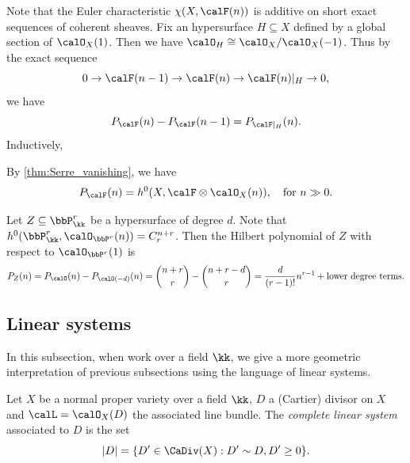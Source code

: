     Note that the Euler characteristic \(\chi(X, \calF(n))\) is additive on short exact sequences of coherent sheaves.
    Fix an hypersurface \(H \subseteq X\) defined by a global section of \(\calO_X(1)\).
    Then we have \(\calO_H \cong \calO_X / \calO_X(-1)\).
    Thus by the exact sequence
    \[ 0 \to \calF(n-1) \to \calF(n) \to \calF(n)|_H \to 0, \]
    we have
    \[ P_{\calF}(n) - P_{\calF}(n-1) = P_{\calF|_H}(n). \]
    Inductively, 

    By \cref{thm:Serre_vanishing}, we have 
    \[ P_{\calF}(n) = h^0(X, \calF \otimes \calO_X(n)), \quad \text{for } n \gg 0. \]

    \begin{example}\label{eg:Hilbert_polynomial_of_hypersurfaces}
        Let \(Z \subseteq \bbP^r_\kk\) be a hypersurface of degree \(d\).
        Note that \(h^0(\bbP^r_\kk, \calO_{\bbP^r}(n)) = C^{n+r}_{r}\).
        Then the Hilbert polynomial of \(Z\) with respect to \(\calO_{\bbP^r}(1)\) is
        \[ P_Z(n) = P_{\calO}(n) - P_{\calO(-d)}(n) = \binom{n+r}{r} - \binom{n+r-d}{r} = \frac{d}{(r-1)!} n^{r-1} + \text{lower degree terms}. \]
    \end{example}






\subsection{Linear systems}


    In this subsection, when work over a field \(\kk\), we give a more geometric interpretation of previous subsections using the language of linear systems.

    \begin{definition}\label{def:geometric_complete_linear_system}
        Let \(X\) be a normal proper variety over a field \(\kk\), \(D\) a (Cartier) divisor on \(X\) and \(\calL=\calO_X(D)\) the associated line bundle.
        The \emph{complete linear system} associated to \(D\) is the set 
        \[ |D| = \{D'\in \CaDiv(X) : D'\sim D, D' \geq 0\}. \]
    \end{definition}

